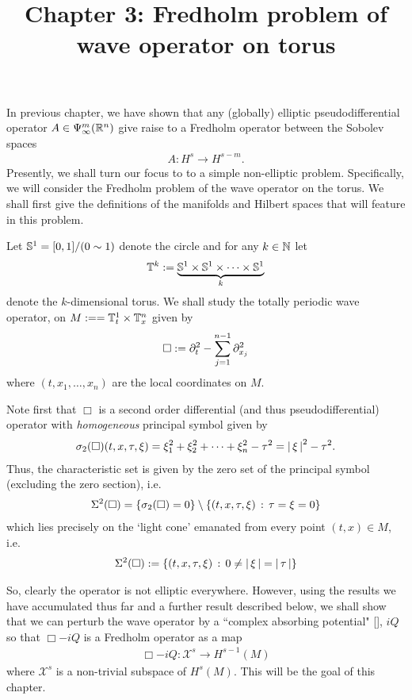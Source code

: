\documentclass[12pt]{article}
\title{Chapter 3: Fredholm problem of wave operator on torus}
\date{}
\begin{document}
\maketitle
In previous chapter, we have shown that any (globally) elliptic pseudodifferential operator $A \in \Psi^{m}_{\infty}(\R^n)$ give raise to a Fredholm operator between the Sobolev spaces
\begin{align*}
A : H^s \to H^{s - m}. 
\end{align*}
Presently, we shall turn our focus to to a simple non-elliptic problem. Specifically, we will consider the Fredholm problem of the wave operator on the torus. We shall first give the definitions of the manifolds and Hilbert spaces that will feature in this problem. \\

\begin{fdefinition} 
Let $\S^1 = [0,1] / (0 \sim 1)$ denote the circle and for any $k \in \N$ let
\begin{align*}
\T^k := \underbrace{\S^1 \times \S^1 \times \dots \times \S^1}_{k}
\end{align*}
denote the $k$-dimensional torus. We shall study the totally periodic wave operator, on $M :=  = \T_t^1 \times \T_x^{n}$ given by
\begin{align}\label{eq: d'Alembertian}
\Box := \p_t^2 - \sum_{j = 1}^{n -1} \p_{x_j}^2
\end{align}
where $(t, x_1, \dots, x_n)$ are the local coordinates on $M$. 
\end{fdefinition}
Note first that $\Box$ is a second order differential (and thus pseudodifferential) operator with \textit{homogeneous} principal symbol given by 
\begin{align*}
\sigma_2(\Box)(t, x, \tau, \xi) = \xi_1^2 + \xi_2^2 + \dots + \xi_{n}^2 - \tau^2 = \abs{\xi}^2 - \tau^2. 
\end{align*}
Thus, the characteristic set is given by the zero set of the principal symbol (excluding the zero section), i.e. 
\begin{align*}
\Char^2(\Box) = \set{\sigma_2(\Box) = 0} \setminus \set{(t, x, \tau, \xi) \wh \tau = \xi = 0}
\end{align*}
which lies precisely on the `light cone' emanated from every point $(t, x) \in M$, i.e.  
\begin{align*}
\Char^2(\Box) := \set{(t, x, \tau, \xi) \wh 0 \neq \abs{\xi}  = \abs{\tau}} 
\end{align*} 

So, clearly the operator is not elliptic everywhere. However, using the results we have accumulated thus far and a further result described below, we shall show that we can perturb the wave operator by a ``complex absorbing potential" \ref{}, $iQ$ so that $\Box - iQ$ is a Fredholm operator as a map 
\begin{align*}
\Box - iQ : \mathcal{X}^s \to H^{s -1}(M)
\end{align*}
where $\mathcal{X}^s$ is a non-trivial subspace of $H^s(M)$. This will be the goal of this chapter. 
\end{document}
